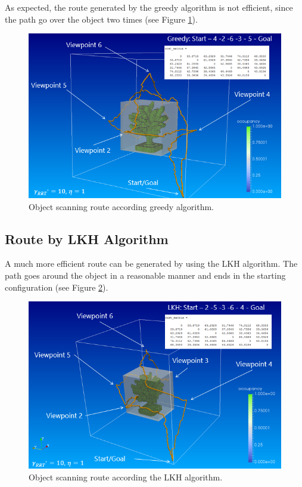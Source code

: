 As expected, the route generated by the greedy algorithm is not efficient, since the path go over the object two times (see Figure \ref{pics:greedy}).

\begin{figure} [h]
	\centering
	\includegraphics[width=1\textwidth]{images/greedy.png}
	\caption{Object scanning route according greedy algorithm.}
	\label{pics:greedy}
\end{figure}

\subsection{Route by LKH Algorithm}

A much more efficient route can be generated by using the LKH algorithm. The path goes around the object in a reasonable manner and ends in the starting configuration (see Figure \ref{pics:lkh_route}).

\begin{figure} [h]
	\centering
	\includegraphics[width=1\textwidth]{images/lkh_route.png}
	\caption{Object scanning route according the LKH algorithm.}
	\label{pics:lkh_route}
\end{figure}